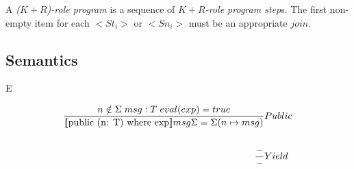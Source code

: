 \documentclass[acmsmall,review,anonymous]{acmart}\settopmatter{printfolios=true}
\begin{document}
A \emph{($K+R$)-role program} is a sequence of \emph{$K+R$-role program step}s.
The first non-empty item for each $<St_i>$ or $<Sn_i>$ must be an appropriate $join$.

\subsection{Semantics}

E

\begin{align*}
	\judge{&Public}{
		n \notin \Sigma \; msg : T \; eval(exp) = true 
	}{
		\semfunc[\text{public (n: T) where exp}] msg  \Sigma = \Sigma (n \mapsto msg )
	}\\
	\\
	\judge{&Yield}{
		-
	}{
		-
	}
\end{align*}






\newpage

%



\newpage


% 

%
\end{document}
